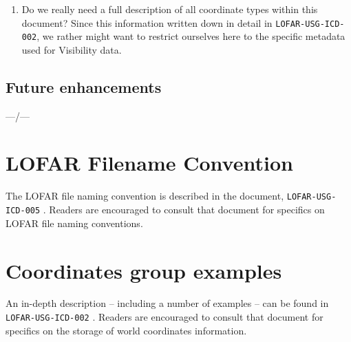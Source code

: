 \documentclass[a4paper,10pt,bibtotoc]{scrartcl}
\begin{document}
\begin{enumerate}
\item Do we really need a full description of all coordinate types within this
  document? Since this information written down in detail in
  \texttt{LOFAR-USG-ICD-002}, we rather might want to restrict ourselves here
  to the specific metadata used for Visibility data.
\end{enumerate}

\subsection{Future enhancements}
\label{sec:future-enhancements}

---/---


\section{LOFAR Filename Convention}
\label{sec:filenames}

The LOFAR file naming convention is described in the document,
\texttt{LOFAR-USG-ICD-005} \cite{lofar.icd.005}. Readers are
encouraged to consult that document for specifics on LOFAR file naming
conventions.


\section{Coordinates group examples}
\label{sec:coordinate examples}

An in-depth description -- including a number of examples -- can be found in
\texttt{LOFAR-USG-ICD-002} \cite{lofar.icd.002}. Readers are encouraged to
consult that document for specifics on the storage of world coordinates
information.


\section*{\glossaryname}
\label{sec:glossary}






\end{document}
